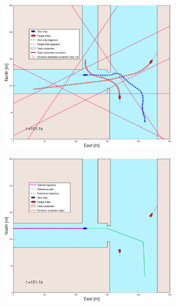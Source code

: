 \begin{figure}[ht]
\begin{subfigure}[b]{0.499\textwidth}
    \end{subfigure}
    \hfill
    \\ 
    \begin{subfigure}[b]{0.49\textwidth}
        \centering
        \includegraphics[width=\textwidth]{Images/Figures/Havn1/_Simple_0fig1_time=101}
    \end{subfigure}
    \hfill
    \begin{subfigure}[b]{0.499\textwidth}
        \centering
        \includegraphics[width=\textwidth]{Images/Figures/Havn1/_Simple_0fig999_time=101}
    \end{subfigure}
    \hfill
\end{figure}
